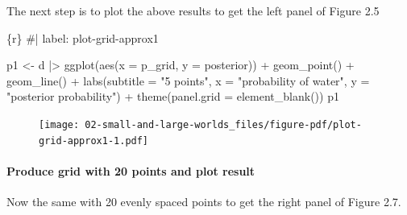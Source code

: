 \documentclass[
  letterpaper,
  DIV=11,
  numbers=noendperiod]{scrreprt}
\let\oldparagraph\paragraph
\renewcommand{\paragraph}[1]{\oldparagraph{#1}\mbox{}}
\newenvironment{Shaded}{\begin{snugshade}}{\end{snugshade}}
\newcommand{\AttributeTok}[1]{\textcolor[rgb]{0.40,0.45,0.13}{#1}}
\newcommand{\CommentTok}[1]{\textcolor[rgb]{0.37,0.37,0.37}{#1}}
\newcommand{\FunctionTok}[1]{\textcolor[rgb]{0.28,0.35,0.67}{#1}}
\newcommand{\InformationTok}[1]{\textcolor[rgb]{0.37,0.37,0.37}{#1}}
\newcommand{\NormalTok}[1]{\textcolor[rgb]{0.00,0.23,0.31}{#1}}
\newcommand{\OtherTok}[1]{\textcolor[rgb]{0.00,0.23,0.31}{#1}}
\newcommand{\SpecialCharTok}[1]{\textcolor[rgb]{0.37,0.37,0.37}{#1}}
\newcommand{\StringTok}[1]{\textcolor[rgb]{0.13,0.47,0.30}{#1}}
\begin{document}
The next step is to plot the above results to get the left panel of
Figure 2.5

\begin{Shaded}
\begin{Highlighting}[]
\InformationTok{\textasciigrave{}\textasciigrave{}\textasciigrave{}\{r\}}
\CommentTok{\#| label: plot{-}grid{-}approx1}

\NormalTok{p1 }\OtherTok{\textless{}{-}} 
\NormalTok{    d }\SpecialCharTok{|\textgreater{}} 
    \FunctionTok{ggplot}\NormalTok{(}\FunctionTok{aes}\NormalTok{(}\AttributeTok{x =}\NormalTok{ p\_grid, }\AttributeTok{y =}\NormalTok{ posterior)) }\SpecialCharTok{+}
      \FunctionTok{geom\_point}\NormalTok{() }\SpecialCharTok{+}
      \FunctionTok{geom\_line}\NormalTok{() }\SpecialCharTok{+}
      \FunctionTok{labs}\NormalTok{(}\AttributeTok{subtitle =} \StringTok{"5 points"}\NormalTok{,}
           \AttributeTok{x =} \StringTok{"probability of water"}\NormalTok{,}
           \AttributeTok{y =} \StringTok{"posterior probability"}\NormalTok{) }\SpecialCharTok{+}
      \FunctionTok{theme}\NormalTok{(}\AttributeTok{panel.grid =} \FunctionTok{element\_blank}\NormalTok{())}
\NormalTok{p1}
\InformationTok{\textasciigrave{}\textasciigrave{}\textasciigrave{}}
\end{Highlighting}
\end{Shaded}

\begin{figure}[H]

{\centering \texttt{[image: 02-small-and-large-worlds\_files/figure-pdf/plot-grid-approx1-1.pdf]}

}

\end{figure}

\hypertarget{produce-grid-with-20-points-and-plot-result}{%
\paragraph{Produce grid with 20 points and plot
result}\label{produce-grid-with-20-points-and-plot-result}}

Now the same with 20 evenly spaced points to get the right panel of
Figure 2.7.
\end{document}

